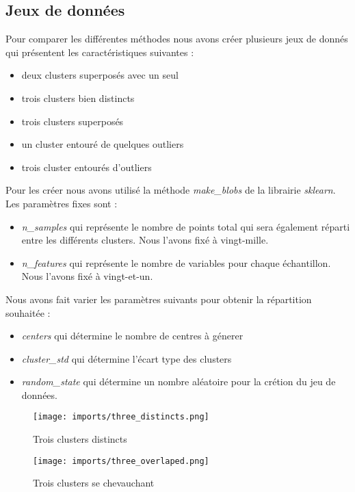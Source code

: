 \subsection{Jeux de données}
Pour comparer les différentes méthodes nous avons créer plusieurs jeux de donnés qui présentent les caractéristiques suivantes :
\begin{itemize}
    \item deux clusters superposés avec un seul
    \item  trois clusters bien distincts
    \item trois clusters superposés
    \item un cluster entouré de quelques outliers
    \item trois cluster entourés d’outliers
\end{itemize}
Pour les créer nous avons utilisé la méthode \textit{make_blobs} de la librairie \textit{sklearn}. Les paramètres fixes sont :
\begin{itemize}
    \item \textit{n_samples} qui représente le nombre de points total qui sera également réparti entre les différents clusters. Nous l'avons fixé à vingt-mille.
    \item \textit{n_features} qui représente le nombre de variables pour chaque échantillon. Nous l'avons fixé à vingt-et-un.
\end{itemize}
Nous avons fait varier les paramètres suivants pour obtenir la répartition souhaitée : 
\begin{itemize}
    \item \textit{centers} qui détermine le nombre de centres à génerer
    \item \textit{cluster_std} qui détermine l'écart type des clusters
    \item \textit{random_state} qui détermine un nombre aléatoire pour la crétion du jeu de données.
\end{itemize}


\begin{center}
    \begin{figure}[ht!]
        \centering
        
        \texttt{[image: imports/three\_distincts.png]}
        
        \caption{Trois clusters distincts}
    \end{figure}
\end{center}

\begin{center}
    \begin{figure}[ht!]
        \centering
        
        \texttt{[image: imports/three\_overlaped.png]}
        
        \caption{Trois clusters se chevauchant}
    \end{figure}
\end{center}

